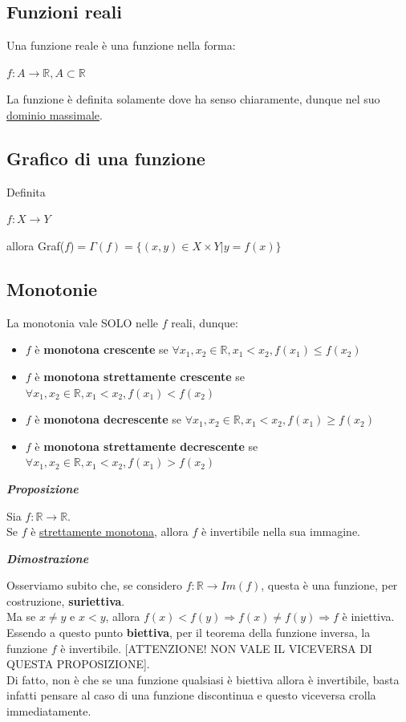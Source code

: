 \documentclass{article}
\theoremstyle{definition}
\begin{document}
\subsection{Funzioni reali}
Una funzione reale è una funzione nella forma:
\begin{center}
    $f: A \to \mathbb{R}, A \subset \mathbb{R}$
\end{center}
La funzione è definita solamente dove ha senso chiaramente, dunque nel suo \underline{dominio massimale}.

\subsection{Grafico di una funzione}
Definita
\begin{center}
    $f: X \to Y$
\end{center}
allora Graf($f$)$= \Gamma(f)=\{(x,y) \in X \times Y | y=f(x)\}$

\subsection{Monotonie}
La monotonia vale SOLO nelle $f$ reali, dunque:
\begin{itemize}
\item $f$ è \textbf{monotona crescente} se $\forall x_1,x_2 \in \mathbb{R}, x_1< x_2, f(x_1) \leqslant  f(x_2)$
    \item 
$f$ è \textbf{monotona strettamente crescente} se $\forall x_1,x_2 \in \mathbb{R}, x_1< x_2, f(x_1) <  f(x_2)$
\item $f$ è \textbf{monotona decrescente} se $\forall x_1,x_2 \in \mathbb{R}, x_1< x_2, f(x_1) \geqslant  f(x_2)$
\item $f$ è \textbf{monotona strettamente decrescente} se $\forall x_1,x_2 \in \mathbb{R}, x_1< x_2, f(x_1) >  f(x_2)$
\end{itemize}
\begin{center}
    \textbf{\textit{Proposizione}}
\end{center}
Sia $f: \mathbb{R} \to \mathbb{R}$.
\\ Se $f$ è \underline{strettamente monotona}, allora $f$ è invertibile nella sua immagine.
\begin{center}
    \textbf{\textit{Dimostrazione}}
\end{center}
Osserviamo subito che, se considero $f: \mathbb{R} \to Im(f)$, questa è una funzione, per costruzione, \textbf{suriettiva}.
\\ Ma se $x \neq y$ e $x<y$, allora $f(x)<f(y) \Rightarrow f(x) \neq f(y) \Rightarrow f$ è iniettiva.
\\ Essendo a questo punto \textbf{biettiva}, per il teorema della funzione inversa, la funzione $f$ è invertibile.
[ATTENZIONE! NON VALE IL VICEVERSA DI QUESTA PROPOSIZIONE].
\\
 Di fatto, non è che se una funzione qualsiasi è biettiva allora è invertibile, basta infatti pensare al caso di una funzione discontinua e questo viceversa crolla immediatamente.
\end{document}
